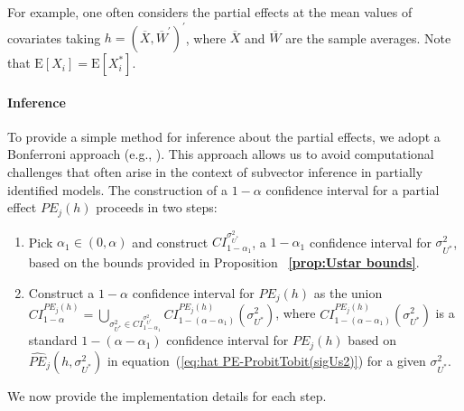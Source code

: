 \documentclass[12pt]{article}
\begin{document}
For example, one often considers the partial effects at the mean values of
covariates taking $h=(\overline{X},\overline{W}^{\prime })^{\prime }$, where 
$\overline{X}$ and $\overline{W}$ are the sample averages.  Note
that $\mathrm{E}\left[ X_{i}\right] =\mathrm{E}\left[ X_{i}^{\ast }\right] $.

\paragraph{Inference}

To provide a simple method for inference about the partial effects, we adopt
a Bonferroni approach (e.g., \citealp{McCloskey2017JoE}). This approach
allows us to avoid computational challenges that often arise in the context
of subvector inference in partially identified models. The construction of a 
$1-\alpha $ confidence interval for a partial effect $PE_{j}(h)$ proceeds in
two steps:

\begin{enumerate}
\item Pick $\alpha _{1}\in (0,\alpha )$ and construct $CI_{1-\alpha
_{1}}^{\sigma _{U^{\ast }}^{2}}$, a $1-\alpha _{1}$ confidence interval for $%
\sigma _{U^{\ast }}^{2}$, based on the bounds provided in Proposition~%
\textbf{\ref{prop:Ustar bounds}}.

\item Construct a $1-\alpha $ confidence interval for $PE_{j}(h)$ as the
union $CI_{1-\alpha }^{PE_{j}(h)}=\bigcup_{\sigma _{U^{\ast }}^{2}\in
CI_{1-\alpha _{1}}^{\sigma _{U^{\ast }}^{2}}}CI_{1-\left( \alpha -\alpha
_{1}\right) }^{PE_{j}(h)}\left( \sigma _{U^{\ast }}^{2}\right) $, where $%
CI_{1-\left( \alpha -\alpha _{1}\right) }^{PE_{j}(h)}\left( \sigma _{U^{\ast
}}^{2}\right) $ is a standard $1-(\alpha -\alpha _{1})$ confidence interval
for $PE_{j}(h)$ based on $\widehat{PE}_{{j}}\left( h,\sigma _{U^{\ast
}}^{2}\right) $ in equation~(\ref{eq:hat PE-ProbitTobit(sigUs2)}) for a
given $\sigma _{U^{\ast }}^{2}$.
\end{enumerate}

We now provide the implementation details for each step.

\smallskip
\end{document}
